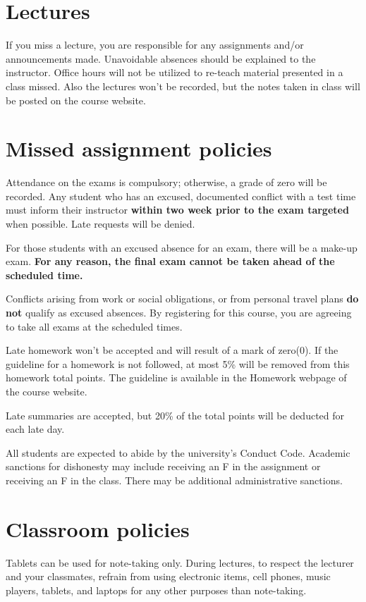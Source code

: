 \documentclass[12pt]{amsart}
\newcommand{\svs}{\vspace{.1cm}}
\begin{document}
\section*{Lectures}
If you miss a lecture, you are responsible for any assignments and/or announcements made. Unavoidable absences should be explained to the instructor. Office hours will not be utilized to re-teach material presented in a class missed. Also the lectures won't be recorded, but the notes taken in class will be posted on the course website.

\section*{Missed assignment policies}

 Attendance on the exams is compulsory; otherwise, a grade of zero will be recorded. Any student who has an excused, documented conflict with a test time must inform their instructor \textbf{within two week prior to the exam targeted} when possible.  Late requests will be denied.

For those students with an excused absence for an exam, there will be a make-up exam. \textbf{For any reason, the final exam cannot be taken ahead of the scheduled time.}

Conflicts arising from work or social obligations, or from personal travel plans \textbf{do not} qualify as excused absences. By registering for this course, you are agreeing to take all exams at the scheduled times.

 Late homework won't be accepted and will result of a mark of zero(0). If the guideline for a homework is not followed, at most 5\% will be removed from this homework total points. The guideline is available in the Homework webpage of the course website.
\svs

  Late summaries are accepted, but 20\% of the total points will be deducted for each late day.

All students are expected to abide by the university's Conduct Code. Academic sanctions for dishonesty may include receiving an F in the assignment or receiving an F in the class. There may be additional administrative sanctions.

\section*{Classroom policies}
Tablets can be used for note-taking only. During lectures, to respect the lecturer and your classmates, refrain from using electronic items, cell phones, music players, tablets, and laptops for any other purposes than note-taking.
\end{document}
